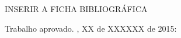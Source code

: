 \documentclass[
	12pt,				%
	openright,			%
	oneside,
	a4paper,			%
	english,			%
	francais,			%
	spanish,			%
	brazil				%
	]{abntex2}
\begin{document}

\frenchspacing 


\imprimircapa

\imprimirfolhaderosto*

INSERIR A FICHA BIBLIOGRÁFICA


%
% 
%
\begin{folhadeaprovacao}

  \begin{center}
    {\ABNTEXchapterfont\large\imprimirautor}

    \vspace*{\fill}\vspace*{\fill}
    \begin{center}
      \ABNTEXchapterfont\bfseries\Large\imprimirtitulo
    \end{center}
    \vspace*{\fill}
    
    \hspace{.45\textwidth}
    \begin{minipage}{.5\textwidth}
        \imprimirpreambulo
    \end{minipage}%
    \vspace*{\fill}
   \end{center}
        
   Trabalho aprovado. \imprimirlocal, XX de XXXXXX de 2015:

      
   \begin{center}
    \vspace*{0.5cm}
    {\large\imprimirlocal}
    \par
    {\large\imprimirdata}
    \vspace*{1cm}
  \end{center}
  
\end{folhadeaprovacao}
\end{document}
